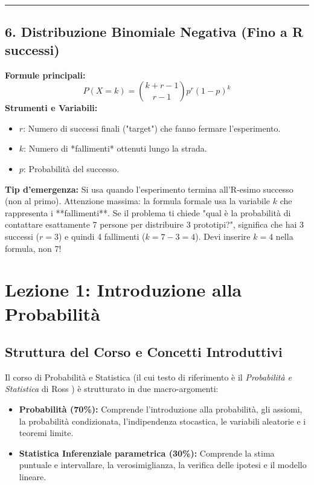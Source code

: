 \documentclass[12pt, a4paper]{article}
\begin{document}
\vspace{0.3cm}\hrule\vspace{0.3cm}

\subsection*{6. Distribuzione Binomiale Negativa (Fino a R successi)}
\textbf{Formule principali:}
$$ P(X=k) = \binom{k+r-1}{r-1} p^r (1-p)^k $$
\textbf{Strumenti e Variabili:}
\begin{itemize}
    \item $r$: Numero di successi finali ("target") che fanno fermare l'esperimento.
    \item $k$: Numero di *fallimenti* ottenuti lungo la strada.
    \item $p$: Probabilità del successo.
\end{itemize}
\textbf{Tip d'emergenza:} Si usa quando l'esperimento termina all'R-esimo successo (non al primo). Attenzione massima: la formula formale usa la variabile $k$ che rappresenta i **fallimenti**. Se il problema ti chiede "qual è la probabilità di contattare esattamente 7 persone per distribuire 3 prototipi?", significa che hai 3 successi ($r=3$) e quindi 4 fallimenti ($k=7-3=4$). Devi inserire $k=4$ nella formula, non 7!


\section{Lezione 1: Introduzione alla Probabilità}

\subsection{Struttura del Corso e Concetti Introduttivi}
Il corso di Probabilità e Statistica (il cui testo di riferimento è il \textit{Probabilità e Statistica} di Ross ) è strutturato in due macro-argomenti:
\begin{itemize}
    \item \textbf{Probabilità (70\%):} Comprende l'introduzione alla probabilità, gli assiomi, la probabilità condizionata, l'indipendenza stocastica, le variabili aleatorie e i teoremi limite.
    \item \textbf{Statistica Inferenziale parametrica (30\%):} Comprende la stima puntuale e intervallare, la verosimiglianza, la verifica delle ipotesi e il modello lineare.
\end{itemize}
\end{document}
